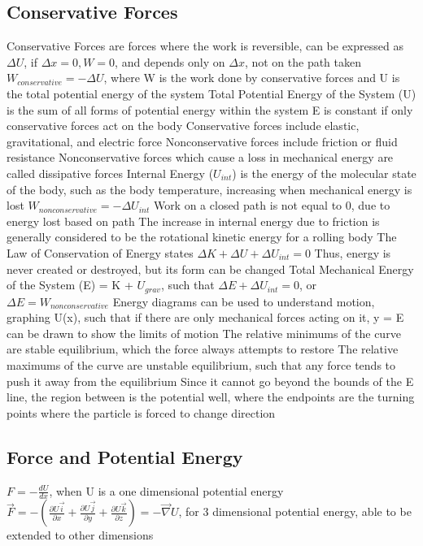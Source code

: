 \documentclass[11 pt, twoside]{article}
\newenvironment{outline*}
{
	\begin{outline}[enumerate]
	}
	{\end{outline}
}
\begin{document}
\subsection{Conservative Forces}
\begin{outline*}
\1 Conservative Forces are forces where the work is reversible, can be expressed as $\Delta U$, if $\Delta x = 0, W = 0$, and depends only on $\Delta x$, not on the path taken
\2 $W_{conservative} = -\Delta U$, where W is the work done by conservative forces and U is the total potential energy of the system
\2 Total Potential Energy of the System (U) is the sum of all forms of potential energy within the system
\2 E is constant if only conservative forces act on the body
\2 Conservative forces include elastic, gravitational, and electric force
\1 Nonconservative forces include friction or fluid resistance
\2 Nonconservative forces which cause a loss in mechanical energy are called dissipative forces
\1 Internal Energy ($U_{int}$) is the energy of the molecular state of the body, such as the body temperature, increasing when mechanical energy is lost
\2 $W_{nonconservative} = -\Delta U_{int}$
\2 Work on a closed path is not equal to 0, due to energy lost based on path
\2 The increase in internal energy due to friction is generally considered to be the rotational kinetic energy for a rolling body
\1 The Law of Conservation of Energy states $\Delta K + \Delta U + \Delta U_{int} = 0$
\2 Thus, energy is never created or destroyed, but its form can be changed
\2 Total Mechanical Energy of the System (E) = K + $U_{grav}$, such that $\Delta E + \Delta U_{int} = 0$, or $\Delta E = W_{nonconservative}$
\1 Energy diagrams can be used to understand motion, graphing U(x), such that if there are only mechanical forces acting on it, y = E can be drawn to show the limits of motion
\2 The relative minimums of the curve are stable equilibrium, which the force always attempts to restore
\2 The relative maximums of the curve are unstable equilibrium, such that any force tends to push it away from the equilibrium
\2 Since it cannot go beyond the bounds of the E line, the region between is the potential well, where the endpoints are the turning points where the particle is forced to change direction
\end{outline*}
\subsection{Force and Potential Energy}
\begin{outline*}
\1 $F = -\frac{dU}{dx}$, when U is a one dimensional potential energy
\1 $\vec{F} = -(\frac{\partial U\vec{i}}{\partial x} + \frac{\partial U\vec{j}}{\partial y} + \frac{\partial U\vec{k}}{\partial z}) = -\vec{\nabla}U$, for 3 dimensional potential energy, able to be extended to other dimensions
\end{outline*}
\end{document}
